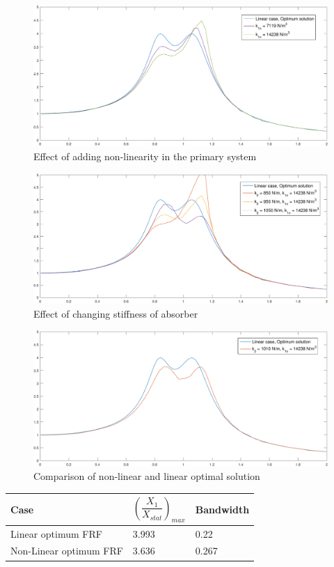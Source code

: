 \begin{figure}[h!]
\includegraphics[width=\textwidth, height = 0.5\textwidth]{"figures/addingNonlinearity"}
\caption{Effect of adding non-linearity in the primary system}
\end{figure}

\begin{figure}[h!]
\includegraphics[width=\textwidth, height = 0.5\textwidth]{"figures/changingk2"}
\caption{Effect of changing stiffness of absorber}
\end{figure}

\begin{figure}[h!]
\includegraphics[width=\textwidth, height = 0.5\textwidth]{"figures/comparing"}
\caption{Comparison of non-linear and linear optimal solution}
\end{figure}

\begin{table}[h!]
\centering
\begin{tabular}{|m{6cm}|m{2cm}|m{2cm}|}
\hline
Case& $\left(\dfrac{X_{1}}{X_{stat}}\right)_{max}$ & Bandwidth \\
\hline
Linear optimum FRF & 3.993 & 0.22 

\\
\hline
Non-Linear optimum FRF & 3.636 & 0.267

 \\ 
\hline
\end{tabular}
\end{table}

